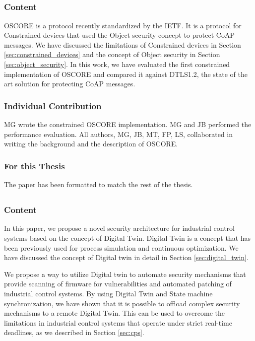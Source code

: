 \subsection{\paperIIItitle}
\subsubsection{Content}
OSCORE is a protocol recently standardized by the IETF. It is a protocol for Constrained devices that used the Object security concept to protect CoAP messages. We have discussed the limitations of Constrained devices in Section \ref{sec:constrained_devices} and the concept of Object security in Section \ref{sec:object_security}. In this work, we have evaluated the first constrained implementation of OSCORE and compared it against DTLS1.2, the state of the art solution for protecting CoAP messages. 
\subsubsection{Individual Contribution}
MG wrote the constrained OSCORE implementation. MG and JB performed the performance evaluation. All authors, MG, JB, MT, FP, LS, collaborated in writing the background and the description of OSCORE.
\subsubsection{For this Thesis}
The paper has been formatted to match the rest of the thesis.

\subsection{\paperIVtitle}
\subsubsection{Content}
In this paper, we propose a novel security architecture for industrial control systems based on the concept of Digital Twin. Digital Twin is a concept that has been previously used for process simulation and continuous optimization. We have discussed the concept of Digital twin in detail in Section \ref{sec:digital_twin}. 

We propose a way to utilize Digital twin to automate security mechanisms that provide scanning of firmware for vulnerabilities and automated patching of industrial control systems. By using Digital Twin and State machine synchronization, we have shown that it is possible to offload complex security mechanisms to a remote Digital Twin. This can be used to overcome the limitations in industrial control systems that operate under strict real-time deadlines, as we described in Section \ref{sec:cps}. 
